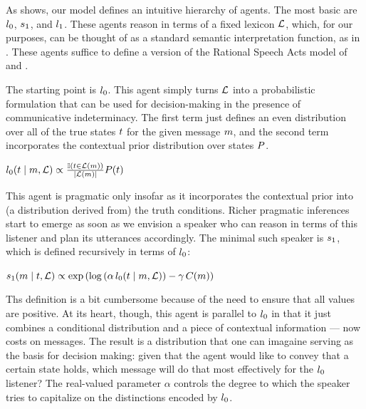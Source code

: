 \documentclass{article}
\begin{document}
As  shows, our model defines an intuitive hierarchy
of agents. The most basic are $l_{0}$, $s_{1}$, and
$l_{1}$. These agents reason in terms of a fixed lexicon
$\mathcal{L}$, which, for our purposes, can be thought of as a standard
semantic interpretation function, as in . These
agents suffice to define a version of the Rational Speech Acts model
of \citet{Frank:Goodman:2012} and \citet{Goodman:Stuhlmuller:2013}.

The starting point is $l_{0}$. This agent simply turns $\mathcal{L}$
into a probabilistic formulation that can be used for decision-making
in the presence of communicative indeterminacy. The first term just
defines an even distribution over all of the true states $t$ for
the given message $m$, and the second term incorporates the
contextual prior distribution over states $P$.
%
\begin{examples}
\item\label{l0}%
  $l_{0}(t \mid m, \mathcal{L}) \propto
  \frac{\mathbb{I}(t \in \mathcal{L}(m))}{|\mathcal{L}(m)|}
  P(t)$
\end{examples}

This agent is pragmatic only insofar as it incorporates the contextual 
prior into (a distribution derived from) the truth conditions. Richer
pragmatic inferences start to emerge as soon as we envision a speaker
who can reason in terms of this listener and plan its utterances 
accordingly. The minimal such speaker is $s_{1}$, which is 
defined recursively in terms of $l_{0}$:
%
\begin{examples}
\item\label{s1}%
  $s_{1}(m \mid t, \mathcal{L}) \propto
  \exp
  \left(
    \log\left(\alpha\,l_{0}(t \mid m, \mathcal{L}) \right)
    - 
    \gamma\,C(m)
  \right)$
\end{examples}
%
Ths definition is a bit cumbersome because of the need to ensure that
all values are positive. At its heart, though, this agent is parallel
to $l_{0}$ in that it just combines a conditional distribution
and a piece of contextual information --- now costs on messages. The
result is a distribution that one can imagaine serving as the basis
for decision making: given that the agent would like to convey that a
certain state holds, which message will do that most effectively for
the $l_{0}$ listener? The real-valued parameter $\alpha$
controls the degree to which the speaker tries to capitalize on the
distinctions encoded by $l_{0}$.
\end{document}
